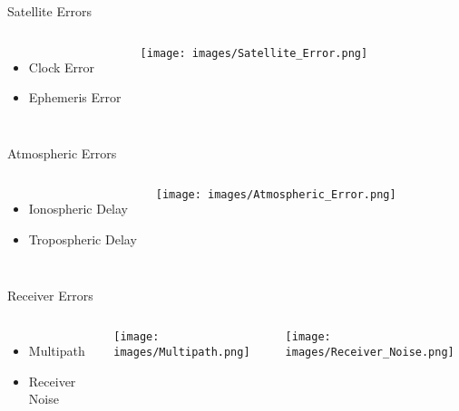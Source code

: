 \documentclass[12pt, compress, xcolor=table]{beamer}
\begin{document}
\begin{frame}{Satellite Errors}
 \begin{columns}
  \begin{itemize}
  \setlength\itemsep{0.5cm}
   \item Clock Error
   \item Ephemeris Error
  \end{itemize}

  \texttt{[image: images/Satellite\_Error.png]}
  
 \end{columns}
\end{frame}

\begin{frame}{Atmospheric Errors}
 \begin{columns}
  \begin{itemize}
  \setlength\itemsep{0.5cm}
   \item Ionospheric Delay
   \item Tropospheric Delay
  \end{itemize}

  \texttt{[image: images/Atmospheric\_Error.png]}
  
 \end{columns}
\end{frame}

\begin{frame}{Receiver Errors}
 \begin{columns}
  \begin{itemize}
  \setlength\itemsep{0.5cm}
   \item Multipath
   \item Receiver Noise
  \end{itemize}

  \texttt{[image: images/Multipath.png]}
  
  \hspace{1cm}
  
  \texttt{[image: images/Receiver\_Noise.png]}
  
 \end{columns}
\end{frame}
\end{document}
